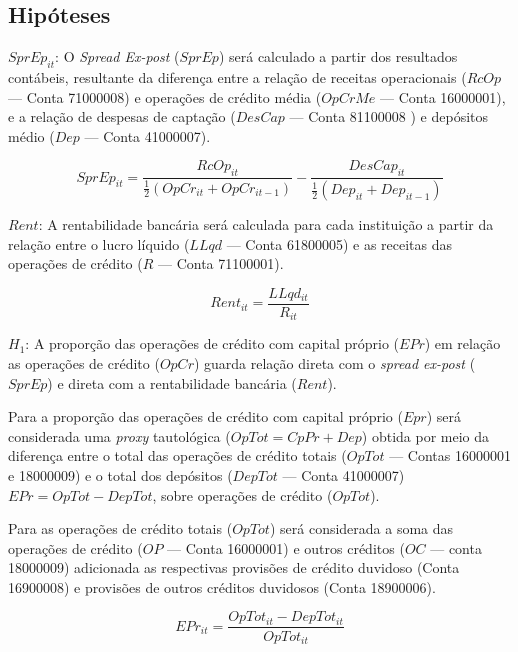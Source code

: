 \documentclass[
  12pt,
  12pt,
  openright,
  oneside,
  a4paper,
  chapter=TITLE,
  section=TITLE,
  subsection=TITLE,
  subsubsection=TITLE,
  english,
  portugues,
  sumario=tradicional]{abntex2}
\begin{document}
\subsection{Hipóteses}

\(SprEp_{it}\): O \emph{Spread Ex-post} (\(SprEp\)) será calculado a partir dos resultados contábeis, resultante da diferença entre a relação de receitas operacionais (\(RcOp\) --- Conta 71000008) e operações de crédito média (\(OpCrMe\) --- Conta 16000001), e a relação de despesas de captação (\(DesCap\) --- Conta 81100008 ) e depósitos médio (\(Dep\) --- Conta 41000007).

\begin{equation}\label{eq:sprbase}
SprEp_{it} = \frac{RcOp_{it}}{\frac{1}{2}(OpCr_{it} + OpCr_{it-1}) } - \frac{DesCap_{it}}{\frac{1}{2}(Dep_{it} + Dep_{it-1})}
\end{equation}

\(Rent\): A rentabilidade bancária será calculada para cada instituição a partir da relação entre o lucro líquido (\(LLqd\) --- Conta 61800005) e as receitas das operações de crédito (\(R\) --- Conta 71100001).

\begin{equation}
Rent_{it} = \frac{LLqd_{it}}{R_{it}}
\end{equation}

\(H_{1}\): A proporção das operações de crédito com capital próprio (\(EPr\)) em relação as operações de crédito (\(OpCr\)) guarda relação direta com o \emph{spread ex-post} (\(SprEp\)) e direta com a rentabilidade bancária (\(Rent\)).

Para a proporção das operações de crédito com capital próprio (\(Epr\)) será considerada uma \emph{proxy} tautológica (\(OpTot = CpPr + Dep\)) obtida por meio da diferença entre o total das operações de crédito totais (\(OpTot\) --- Contas 16000001 e 18000009) e o total dos depósitos (\(DepTot\) --- Conta 41000007) \(EPr = OpTot - DepTot\), sobre operações de crédito (\(OpTot\)).

Para as operações de crédito totais (\(OpTot\)) será considerada a soma das operações de crédito (\(OP\) --- Conta 16000001) e outros créditos (\(OC\) --- conta 18000009) adicionada as respectivas provisões de crédito duvidoso (Conta 16900008) e provisões de outros créditos duvidosos (Conta 18900006).

\begin{equation}
EPr_{it} = \frac{OpTot_{it} - DepTot_{it}}{OpTot_{it}}
\end{equation}
\end{document}
